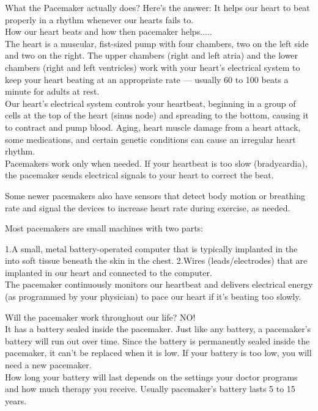 \documentclass[12pt]{article}
\begin{document}
What the Pacemaker actually does? Here's the answer: It helps our heart to beat properly in a rhythm whenever our hearts fails to.
\\
How our heart beats and how then pacemaker helps.....
\\
The heart is a muscular, fist-sized pump with four chambers, two on the left side and two on the right. The upper chambers (right and left atria) and the lower chambers (right and left ventricles) work with your heart's electrical system to keep your heart beating at an appropriate rate — usually 60 to 100 beats a minute for adults at rest.
\\
Our heart's electrical system controls your heartbeat, beginning in a group of cells at the top of the heart (sinus node) and spreading to the bottom, causing it to contract and pump blood. Aging, heart muscle damage from a heart attack, some medications, and certain genetic conditions can cause an irregular heart rhythm.
\\
Pacemakers work only when needed. If your heartbeat is too slow (bradycardia), the pacemaker sends electrical signals to your heart to correct the beat.

Some newer pacemakers also have sensors that detect body motion or breathing rate and signal the devices to increase heart rate during exercise, as needed.

Most pacemakers are small machines with two parts:

1.A small, metal battery-operated computer that is typically implanted in the into soft tissue beneath the skin in the chest.
2.Wires (leads/electrodes) that are implanted in our heart and connected to the computer.
\\
The pacemaker continuously monitors our heartbeat and delivers electrical energy (as programmed by your physician) to pace our heart if it’s beating too slowly.

\indent

Will the pacemaker work throughout our life? NO!
\\
It has a battery sealed inside the pacemaker.
Just like any battery, a pacemaker’s battery will run out over time. Since the battery is permanently sealed inside the pacemaker, it can’t be replaced when it is low. If your battery is too low, you will need a new pacemaker.
\\
How long your battery will last depends on the settings your doctor programs and how much therapy you receive.
Usually pacemaker's battery lasts 5 to 15 years.
\\
\end{document}
